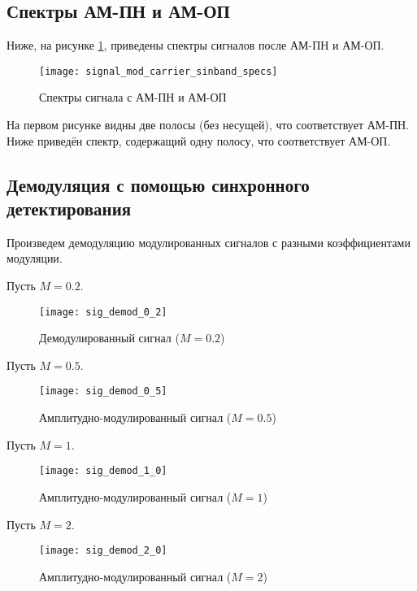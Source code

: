 \subsection{Спектры АМ-ПН и АМ-ОП}
Ниже, на рисунке \ref{pic:signal_mod_carrier_sinband_specs}, приведены спектры сигналов после АМ-ПН и АМ-ОП.
\begin{figure}[H]
	\begin{center}
		\texttt{[image: signal\_mod\_carrier\_sinband\_specs]}
		\caption{Спектры сигнала с АМ-ПН и АМ-ОП} 
		\label{pic:signal_mod_carrier_sinband_specs} %
	\end{center}
\end{figure}
На первом рисунке видны две полосы (без несущей), что соответствует АМ-ПН. Ниже приведён спектр, содержащий одну полосу, что соответствует АМ-ОП.

\subsection{Демодуляция с помощью синхронного детектирования}
Произведем демодуляцию модулированных сигналов с разными коэффициентами модуляции.

Пусть $M = 0.2$.
\begin{figure}[H]
	\begin{center}
		\texttt{[image: sig\_demod\_0\_2]}
		\caption{Демодулированный сигнал ($M = 0.2$)} 
		\label{pic:sig_demod_0_2} %
	\end{center}
\end{figure}

Пусть $M = 0.5$.
\begin{figure}[H]
	\begin{center}
		\texttt{[image: sig\_demod\_0\_5]}
		\caption{Амплитудно-модулированный сигнал ($M = 0.5$)} 
		\label{pic:sig_demod_0_5} %
	\end{center}
\end{figure}

Пусть $M = 1$.
\begin{figure}[H]
	\begin{center}
		\texttt{[image: sig\_demod\_1\_0]}
		\caption{Амплитудно-модулированный сигнал ($M = 1$)} 
		\label{pic:sig_demod_1_0} %
	\end{center}
\end{figure}

Пусть $M = 2$.
\begin{figure}[H]
	\begin{center}
		\texttt{[image: sig\_demod\_2\_0]}
		\caption{Амплитудно-модулированный сигнал ($M = 2$)} 
		\label{pic:sig_demod_2_0} %
	\end{center}
\end{figure}

